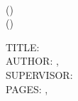 \noindent
\thesisInstitution{} \\
\thesisTargetDegreeName{} (\thesisSubmissionYear{}) \\
\thesisCityProvince{} (\thesisInstitutionDepartment{}) 

\vspace{2cm}

\noindent
TITLE: \thesisTitle{} \\
AUTHOR: \thesisAuthorName{}, \thesisAuthorCredentials{} \\
SUPERVISOR: \thesisSupervisor{} \\
PAGES: \pageref{\thesisLastPageOfFrontMatterLabel}, \pageref{LastPage}
